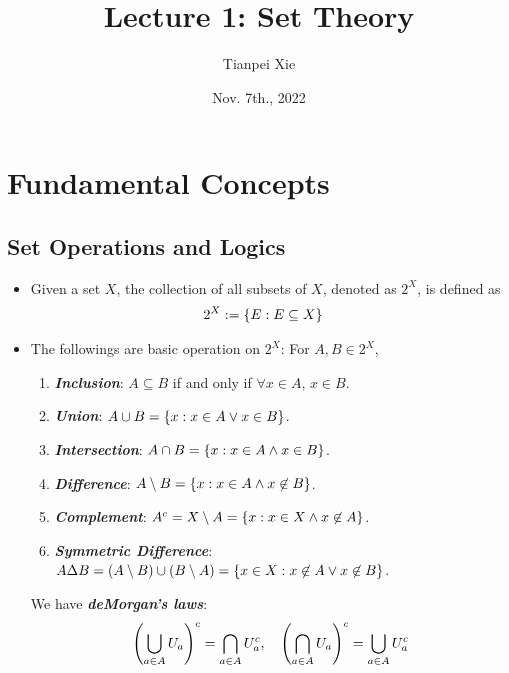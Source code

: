 \documentclass[11pt]{article}
\begin{document}
\title{Lecture 1: Set Theory}
\author{ Tianpei Xie}
\date{Nov. 7th., 2022}
\maketitle
\tableofcontents
\newpage
\section{Fundamental Concepts}
\subsection{Set Operations and Logics}
\begin{itemize}
\item \begin{definition}
Given a set $X$, the collection of all subsets of $X$, denoted as $2^X$, is defined as
\begin{align*}
2^X &:= \left\{E: E \subseteq X\right\}
\end{align*}
\end{definition}

\item \begin{remark}
The followings are basic operation on $2^X$: For $A, B \in 2^X$,
\begin{enumerate}
\item \emph{\textbf{Inclusion}}:   $A \subseteq B$ if and only if $\forall x \in A$, $x \in B$.
\item \emph{\textbf{Union}}:  $A \cup B = \left\{x: x \in A \lor x \in B\right\}$.
\item \emph{\textbf{Intersection}}:  $A \cap B = \left\{x: x \in A \land x \in B\right\}$.
\item \emph{\textbf{Difference}}:  $A \setminus B = \left\{x: x \in A \land x \not\in B\right\}$.
\item \emph{\textbf{Complement}}: $A^{c} = X \setminus A = \left\{x: x \in X \land x \not\in A\right\}$.
\item \emph{\textbf{Symmetric Difference}}:  $A \Delta B = (A \setminus B) \cup (B \setminus A) = \left\{x \in X: x \not\in A \lor x \not\in B\right\}$.
\end{enumerate}
We have \emph{\textbf{deMorgan's laws}}:
\begin{align*}
\left(\bigcup_{a \in A}U_a\right)^c = \bigcap_{a \in A}U_a^c, \quad \left(\bigcap_{a \in A}U_a\right)^c = \bigcup_{a \in A}U_a^c
\end{align*}
\end{remark}


\end{itemize}
\end{document}
